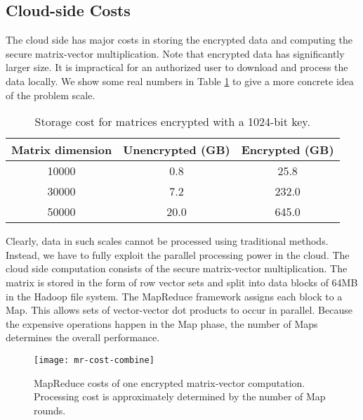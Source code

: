 \documentclass[10pt, conference, compsocconf]{IEEEtran}
\begin{document}
\subsection{Cloud-side Costs}
The cloud side has major costs in storing the encrypted data and computing the secure matrix-vector multiplication. Note that encrypted data has significantly larger size. It is impractical for an authorized user to download and process the data locally. We show some real numbers in Table \ref{tab:cloud-storage-cost} to give a more concrete idea of the problem scale. 



\begin{table}[tbh]
\scriptsize
\centering
\begin{tabular}{|c|c|c|}
\hline
Matrix dimension &Unencrypted (GB) & Encrypted (GB) \\
\hline
10000& 0.8 & 25.8\\
30000&7.2 & 232.0\\
50000&20.0& 645.0\\
\hline
\end{tabular}
\caption{Storage cost for matrices encrypted with a 1024-bit key.} \label{tab:cloud-storage-cost}
\vspace{-0.5cm}
\normalsize
\end{table}
 
Clearly, data in such scales cannot be processed using traditional methods. Instead, we have to fully exploit the parallel processing power in the cloud. The cloud side computation consists of the secure matrix-vector multiplication. The matrix is stored in the form of row vector sets and split into data blocks of 64MB in the Hadoop file system. The MapReduce framework assigns each block to a Map. This allows sets of vector-vector dot products to occur in parallel. Because the expensive operations happen in the Map phase, the number of Maps determines the overall performance. 

\begin{figure}[tbh]
\centering
\begin{minipage}{.9\linewidth}
\centering
\texttt{[image: mr-cost-combine]}
\vspace{-0.75cm}
\caption{MapReduce costs of one encrypted matrix-vector computation.  Processing cost is approximately determined by the number of Map rounds.}\label{fig:mr-cost-combine}
\end{minipage}
\vspace{-0.5cm}
\end{figure}
\end{document}
